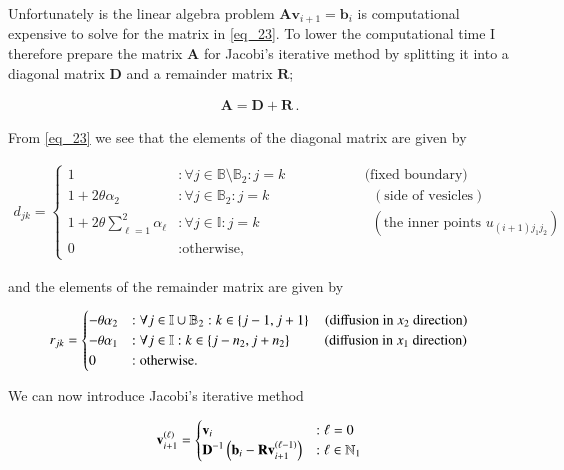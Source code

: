 \documentclass[11pt,english,a4paper]{article}
\begin{document}
\begin{flushleft}
Unfortunately  is the linear algebra problem $\textbf{A}\textbf{v}_{i+1} = \textbf{b}_i$ is computational expensive to solve for the matrix in \eqref{eq_23}. To lower the computational time I therefore prepare the matrix $\textbf{A}$ for Jacobi's iterative method by splitting it into a diagonal matrix $\textbf{D}$ and a remainder matrix $\textbf{R}$;

\begin{align*}
\textbf{A} = \textbf{D} + \textbf{R} \,.
\end{align*}

From \eqref{eq_23} we see that the elements of the diagonal matrix are given by

\begin{align}
d_{jk} = \begin{cases} 
1 &:\forall j\in\mathbb{B}\setminus\mathbb{B}_2  : j=k \,\,\,\,\quad\qquad\qquad \text{(fixed boundary)}\\
1+ 2\theta \alpha_2 &: \forall j\in\mathbb{B}_2: j=k \,\,\quad\qquad\qquad\qquad (\text{side of vesicles}) \\ 
1+ 2\theta \sum_{\ell = 1}^2 \alpha_\ell &: \forall j\in\mathbb{I}: j=k \qquad\qquad\qquad\qquad (\text{the inner points }u_{(i+1)j_1j_2}) \\ 
 0 & : \text{otherwise,} \end{cases}
\label{eq_25}
\end{align}

and the elements of the remainder matrix are given by

\begin{align}
r_{jk} = \begin{cases} 
-\theta \alpha_2 &: \forall j\in\mathbb{I}\cup\mathbb{B}_2: k\in\left\lbrace{j-1,j+1}\right\rbrace\quad \text{(diffusion in $x_2$ direction)} \\ 
- \theta \alpha_1 &: \forall j\in\mathbb{I} : k \in \left\lbrace{j-n_2,j+n_2}\right\rbrace \,\,\qquad\text{(diffusion in $x_1$ direction)} \\
 0 & : \text{otherwise.} \end{cases}
\label{eq_26}
\end{align}

We can now introduce Jacobi's iterative method

\begin{align*}
\textbf{v}_{i+1}^{(\ell)} = \begin{cases}
\textbf{v}_i &: \ell=0 \\
\textbf{D}^{-1}\left({\textbf{b}_i-\textbf{R}\textbf{v}_{i+1}^{(\ell-1)}}\right) &: \ell\in\mathbb{N}_1
\end{cases}
\end{align*}


\end{flushleft}
\end{document}
